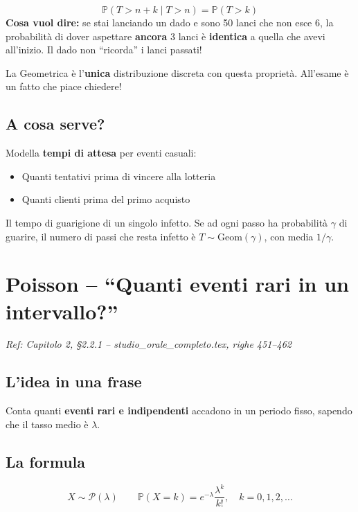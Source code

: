 \documentclass[a4paper,11pt]{article}
\newcommand{\PP}{\mathbb{P}}
\begin{document}
\begin{tcolorbox}[mybox=red, title=Assenza di memoria (righe 484--491)]
\[
\PP(T > n+k \mid T > n) = \PP(T > k)
\]
\textbf{Cosa vuol dire:} se stai lanciando un dado e sono 50 lanci che non esce 6, la probabilità di dover aspettare \textbf{ancora} 3 lanci è \textbf{identica} a quella che avevi all'inizio. Il dado non ``ricorda'' i lanci passati!

La Geometrica è l'\textbf{unica} distribuzione discreta con questa proprietà. All'esame è un fatto che piace chiedere!
\end{tcolorbox}

\subsection*{A cosa serve?}
Modella \textbf{tempi di attesa} per eventi casuali:
\begin{itemize}[nosep]
    \item Quanti tentativi prima di vincere alla lotteria
    \item Quanti clienti prima del primo acquisto
\end{itemize}

\begin{tcolorbox}[mybox=green, title=Nel modello SIR]
Il tempo di guarigione di un singolo infetto. Se ad ogni passo ha probabilità $\gamma$ di guarire, il numero di passi che resta infetto è $T \sim \text{Geom}(\gamma)$, con media $1/\gamma$.
\end{tcolorbox}

\section{Poisson -- ``Quanti eventi rari in un intervallo?''}
\label{sec:poisson}

\textit{Ref: Capitolo 2, \S2.2.1 -- studio\_orale\_completo.tex, righe 451--462}

\subsection*{L'idea in una frase}
Conta quanti \textbf{eventi rari e indipendenti} accadono in un periodo fisso, sapendo che il tasso medio è $\lambda$.

\subsection*{La formula}
\[
X \sim \mathcal{P}(\lambda) \qquad \PP(X = k) = e^{-\lambda} \frac{\lambda^k}{k!}, \quad k = 0, 1, 2, \dots
\]
\end{document}
